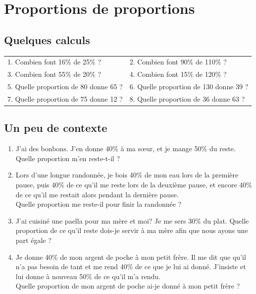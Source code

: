 \documentclass[oneside,12pt]{article}          %
\begin{document}
\section{Proportions de proportions}

\subsection{Quelques calculs}
\renewcommand{\arraystretch}{1.25}
\begin{tabular}{p{9cm} p{9cm}}
    1. Combien font 16$\%$ de 25$\%$ ? & 
    2. Combien font 90$\%$ de 110$\%$ ? \\
    3. Combien font 55$\%$ de 20$\%$ ? & 
    4. Combien font 15$\%$ de 120$\%$ ? \\
    5. Quelle proportion de 80 donne 65 ? &
    6. Quelle proportion de 130 donne 39 ? \\
    7. Quelle proportion de 75 donne 12 ? &
    8. Quelle proportion de 36 donne 63 ? \\
\end{tabular}



\subsection{Un peu de contexte}
\begin{enumerate}
    \item J'ai des bonbons. J'en donne 40$\%$ à ma sœur, et je mange 50$\%$ du reste. Quelle proportion m'en reste-t-il ?
    \item Lors d'une longue randonnée, je bois 40$\%$ de mon eau lors de la première pause, puis 40$\%$ de ce qu'il me reste lors de la deuxième pause, et encore 40$\%$ de ce qu'il me restait alors pendant la dernière pause. \\
    Quelle proportion me reste-il pour finir la randonnée ?
    \item J'ai cuisiné une paella pour ma mère et moi? Je me sers 30$\%$ du plat. Quelle proportion de ce qu'il reste dois-je servir à ma mère afin que nous ayons une part égale ?
    \item Je donne 40$\%$ de mon argent de poche à mon petit frère. Il me dit que qu'il n'a pas besoin de tant et me rend 40$\%$ de ce que je lui ai donné. J'insiste et lui donne à nouveau 50$\%$ de ce qu'il m'a rendu.\\
    Quelle proportion de mon argent de poche ai-je donné à mon petit frère ?
\end{enumerate}
\end{document}
